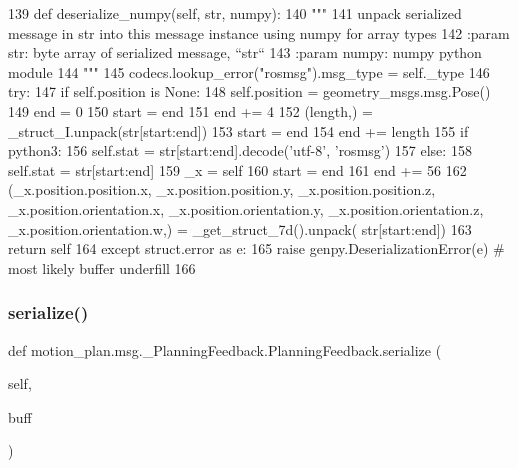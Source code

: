 \begin{DoxyCode}
139   \textcolor{keyword}{def }deserialize\_numpy(self, str, numpy):
140     \textcolor{stringliteral}{"""}
141 \textcolor{stringliteral}{    unpack serialized message in str into this message instance using numpy for array types}
142 \textcolor{stringliteral}{    :param str: byte array of serialized message, ``str``}
143 \textcolor{stringliteral}{    :param numpy: numpy python module}
144 \textcolor{stringliteral}{    """}
145     codecs.lookup\_error(\textcolor{stringliteral}{"rosmsg"}).msg\_type = self.\_type
146     \textcolor{keywordflow}{try}:
147       \textcolor{keywordflow}{if} self.position \textcolor{keywordflow}{is} \textcolor{keywordtype}{None}:
148         self.position = geometry\_msgs.msg.Pose()
149       end = 0
150       start = end
151       end += 4
152       (length,) = \_struct\_I.unpack(str[start:end])
153       start = end
154       end += length
155       \textcolor{keywordflow}{if} python3:
156         self.stat = str[start:end].decode(\textcolor{stringliteral}{'utf-8'}, \textcolor{stringliteral}{'rosmsg'})
157       \textcolor{keywordflow}{else}:
158         self.stat = str[start:end]
159       \_x = self
160       start = end
161       end += 56
162       (\_x.position.position.x, \_x.position.position.y, \_x.position.position.z, \_x.position.orientation.x, 
      \_x.position.orientation.y, \_x.position.orientation.z, \_x.position.orientation.w,) = \_get\_struct\_7d().unpack(
      str[start:end])
163       \textcolor{keywordflow}{return} self
164     \textcolor{keywordflow}{except} struct.error \textcolor{keyword}{as} e:
165       \textcolor{keywordflow}{raise} genpy.DeserializationError(e)  \textcolor{comment}{# most likely buffer underfill}
166 
\end{DoxyCode}
\mbox{\label{classmotion__plan_1_1msg_1_1__PlanningFeedback_1_1PlanningFeedback_a2df4086e9944100382853159abedc69a}} 
\subsubsection{\texorpdfstring{serialize()}{serialize()}}
{\footnotesize\ttfamily def motion\+\_\+plan.\+msg.\+\_\+\+Planning\+Feedback.\+Planning\+Feedback.\+serialize (\begin{DoxyParamCaption}\item[{}]{self,  }\item[{}]{buff }\end{DoxyParamCaption})}

